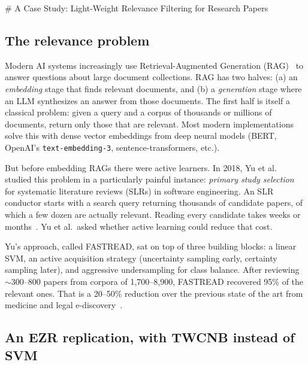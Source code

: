 # A Case Study: Light-Weight Relevance Filtering for Research Papers

\subsection*{The relevance problem}

Modern AI systems increasingly use Retrieval-Augmented
Generation (RAG)~\cite{lewis2020retrieval} to answer questions
about large document collections. RAG has two halves: (a) an
{\em embedding} stage that finds relevant documents, and (b) a
{\em generation} stage where an LLM synthesizes an answer from
those documents. The first half is itself a classical problem:
given a query and a corpus of thousands or millions of
documents, return only those that are relevant. Most modern
implementations solve this with dense vector embeddings from
deep neural models (BERT, OpenAI's \texttt{text-embedding-3},
sentence-transformers, etc.).

But before embedding RAGs there were active learners. In 2018,
Yu et al.~\cite{yu2018finding} studied this problem in a
particularly painful instance: {\em primary study selection}
for systematic literature reviews (SLRs) in software
engineering. An SLR conductor starts with a search query
returning thousands of candidate papers, of which a few dozen
are actually relevant. Reading every candidate takes weeks
or months~\cite{kitchenham2010,carver2013}. Yu et al.\ asked
whether active learning could reduce that cost.

Yu's approach, called FASTREAD, sat on top of three building
blocks: a linear SVM, an active acquisition strategy
(uncertainty sampling early, certainty sampling later), and
aggressive undersampling for class balance. After reviewing
$\sim$300--800 papers from corpora of 1{,}700--8{,}900,
FASTREAD recovered 95\% of the relevant ones. That is a
20--50\% reduction over the previous state of the art from
medicine and legal e-discovery~\cite{wallace2010,miwa2014,
cormack2014}.

\subsection*{An EZR replication, with TWCNB instead of SVM}

